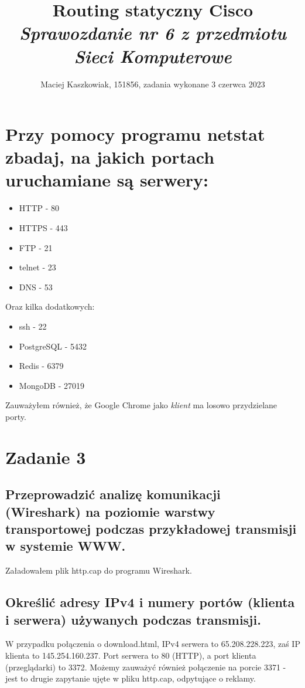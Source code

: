 \documentclass[polish, a4paper]{article}
\title{Routing statyczny Cisco\\
        \Large \emph{Sprawozdanie nr 6 z przedmiotu Sieci Komputerowe}}
\author{Maciej Kaszkowiak, 151856, zadania wykonane 3 czerwca 2023}
\date{\vspace{-5ex}} %
\begin{document}
\maketitle

\tableofcontents

\newpage

\section{Przy pomocy programu netstat zbadaj, na jakich portach
uruchamiane są serwery:}

\begin{itemize}
\item{HTTP - 80}
\item{HTTPS - 443}
\item{FTP - 21}
\item{telnet - 23}
\item{DNS - 53}
\end{itemize}

Oraz kilka dodatkowych:
\begin{itemize}
\item{ssh - 22}
\item{PostgreSQL - 5432}
\item{Redis - 6379}
\item{MongoDB - 27019}
\end{itemize}

Zauważyłem również, że Google Chrome jako \emph{klient} ma losowo przydzielane porty. 

\section{Zadanie 3}
\subsection{Przeprowadzić analizę komunikacji (Wireshark) na poziomie warstwy transportowej
podczas przykładowej transmisji w systemie WWW.}

Załadowałem plik http.cap do programu Wireshark.

\subsection{
Określić adresy IPv4 i numery portów (klienta i serwera) używanych podczas transmisji.
}

W przypadku połączenia o download.html, IPv4 serwera to 65.208.228.223, zaś IP klienta to 145.254.160.237. Port serwera to 80 (HTTP), a port klienta (przeglądarki) to 3372. Możemy zauważyć również połączenie na porcie 3371 - jest to drugie zapytanie ujęte w pliku http.cap, odpytujące o reklamy.  
\end{document}
